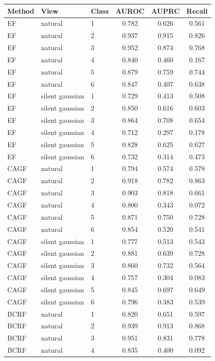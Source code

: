 \begin{tabular}{lllccc}
\toprule
Method & View & Class & AUROC & AUPRC & Recall \\
\midrule
EF & natural & 1 & 0.782 & 0.626 & 0.561 \\
EF & natural & 2 & 0.937 & 0.915 & 0.826 \\
EF & natural & 3 & 0.952 & 0.874 & 0.768 \\
EF & natural & 4 & 0.840 & 0.460 & 0.167 \\
EF & natural & 5 & 0.879 & 0.759 & 0.744 \\
EF & natural & 6 & 0.847 & 0.407 & 0.638 \\
EF & silent gaussian & 1 & 0.729 & 0.413 & 0.508 \\
EF & silent gaussian & 2 & 0.850 & 0.616 & 0.603 \\
EF & silent gaussian & 3 & 0.864 & 0.708 & 0.654 \\
EF & silent gaussian & 4 & 0.712 & 0.297 & 0.178 \\
EF & silent gaussian & 5 & 0.828 & 0.625 & 0.627 \\
EF & silent gaussian & 6 & 0.732 & 0.314 & 0.473 \\
CAGF & natural & 1 & 0.794 & 0.574 & 0.578 \\
CAGF & natural & 2 & 0.918 & 0.782 & 0.863 \\
CAGF & natural & 3 & 0.903 & 0.818 & 0.661 \\
CAGF & natural & 4 & 0.800 & 0.343 & 0.072 \\
CAGF & natural & 5 & 0.871 & 0.750 & 0.728 \\
CAGF & natural & 6 & 0.854 & 0.520 & 0.541 \\
CAGF & silent gaussian & 1 & 0.777 & 0.513 & 0.543 \\
CAGF & silent gaussian & 2 & 0.881 & 0.639 & 0.728 \\
CAGF & silent gaussian & 3 & 0.860 & 0.732 & 0.564 \\
CAGF & silent gaussian & 4 & 0.757 & 0.304 & 0.083 \\
CAGF & silent gaussian & 5 & 0.845 & 0.697 & 0.649 \\
CAGF & silent gaussian & 6 & 0.796 & 0.383 & 0.539 \\
BCRF & natural & 1 & 0.820 & 0.651 & 0.597 \\
BCRF & natural & 2 & 0.939 & 0.913 & 0.868 \\
BCRF & natural & 3 & 0.951 & 0.831 & 0.778 \\
BCRF & natural & 4 & 0.835 & 0.400 & 0.092 \\

\end{tabular}
